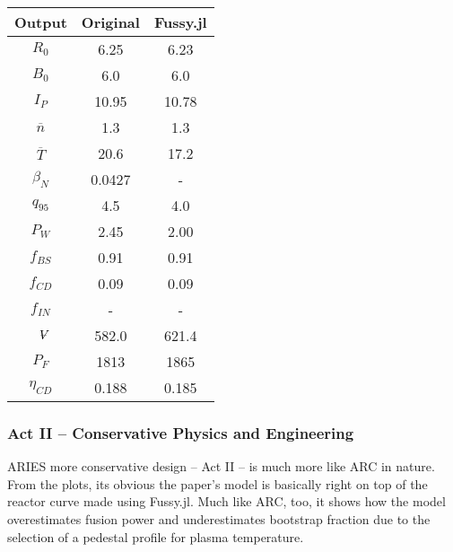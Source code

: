 \begin{table}[h!]
\begin{subtable}[t]{0.5\textwidth}
\begin{tabular}{ c|c|c }
Output           & Original         & Fussy.jl        \\
\hline
$R_{0}$          & 6.25             & 6.23           \\
$B_{0}$          & 6.0              & 6.0           \\
$I_{P}$          & 10.95            & 10.78           \\
$\overline n$    & 1.3              & 1.3           \\
$\overline T$    & 20.6             & 17.2            \\
$\beta_{N}$       & 0.0427           & -          \\
$q_{95}$         & 4.5              & 4.0           \\
$P_{W}$          & 2.45             & 2.00           \\
$f_{BS}$         & 0.91             & 0.91           \\
$f_{CD}$         & 0.09             & 0.09           \\
$f_{IN}$         & -              & -             \\
$\volume$         & 582.0            & 621.4           \\
$P_{F}$          & 1813           & 1865          \\
$\eta_{CD}$      & 0.188            & 0.185          \\

\end{tabular}
\end{subtable}
\hfill
\hfill
\end{table}

\newpage 

\subsubsection{Act II -- Conservative Physics and Engineering}

ARIES more conservative design -- Act II -- is much more like ARC in nature. From the plots, its obvious the paper's model is basically right on top of the reactor curve made using Fussy.jl.  Much like ARC, too, it shows how the model overestimates fusion power and underestimates bootstrap fraction due to the selection of a pedestal profile for plasma temperature.

